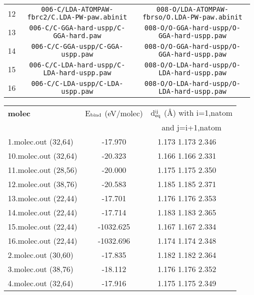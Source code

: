 \documentclass[onecolumn]{revtex4}
\begin{document}
\begin{center}
\begin{tabular}{lcc}
12 & \verb?006-C/LDA-ATOMPAW-fbrc2/C.LDA-PW-paw.abinit? & \verb?008-O/LDA-ATOMPAW-fbrso/O.LDA-PW-paw.abinit? \\
13 & \verb?006-C/C-GGA-hard-uspp/C-GGA-hard.paw? & \verb?008-O/O-GGA-hard-uspp/O-GGA-hard-uspp.paw? \\
14 & \verb?006-C/C-GGA-uspp/C-GGA-uspp.paw? & \verb?008-O/O-GGA-hard-uspp/O-GGA-hard-uspp.paw? \\
15 & \verb?006-C/C-LDA-hard-uspp/C-LDA-hard-uspp.paw? & \verb?008-O/O-LDA-hard-uspp/O-LDA-hard-uspp.paw? \\
16 & \verb?006-C/C-LDA-uspp/C-LDA-uspp.paw? & \verb?008-O/O-LDA-hard-uspp/O-LDA-hard-uspp.paw? \\
\hline
\end{tabular}
\end{center}
\begin{center}
\begin{tabular}{lccccc}
\hline
\hline
\bf{molec}&\multicolumn{2}{c}{E$_{\rm bind}$ (eV/molec)}&\multicolumn{3}{c}{d$_{\rm eq}^{\rm ij}$ (\AA) with i=1,natom} \\
&\multicolumn{2}{c}{}&\multicolumn{3}{c}{and j=i+1,natom} \\
\hline
1.molec.out (32,64)&\multicolumn{2}{c}{-17.970}&\multicolumn{2}{c}{1.173 1.173 2.346 } \\ 
10.molec.out (32,64)&\multicolumn{2}{c}{-20.323}&\multicolumn{2}{c}{1.166 1.166 2.331 } \\ 
11.molec.out (28,56)&\multicolumn{2}{c}{-20.000}&\multicolumn{2}{c}{1.175 1.175 2.350 } \\ 
12.molec.out (38,76)&\multicolumn{2}{c}{-20.583}&\multicolumn{2}{c}{1.185 1.185 2.371 } \\ 
13.molec.out (22,44)&\multicolumn{2}{c}{-17.701}&\multicolumn{2}{c}{1.176 1.176 2.353 } \\ 
14.molec.out (22,44)&\multicolumn{2}{c}{-17.714}&\multicolumn{2}{c}{1.183 1.183 2.365 } \\ 
15.molec.out (22,44)&\multicolumn{2}{c}{-1032.625}&\multicolumn{2}{c}{1.167 1.167 2.334 } \\ 
16.molec.out (22,44)&\multicolumn{2}{c}{-1032.696}&\multicolumn{2}{c}{1.174 1.174 2.348 } \\ 
2.molec.out (30,60)&\multicolumn{2}{c}{-17.835}&\multicolumn{2}{c}{1.182 1.182 2.364 } \\ 
3.molec.out (38,76)&\multicolumn{2}{c}{-18.112}&\multicolumn{2}{c}{1.176 1.176 2.352 } \\ 
4.molec.out (32,64)&\multicolumn{2}{c}{-17.916}&\multicolumn{2}{c}{1.175 1.175 2.349 } \\ 

\end{tabular}
\end{center}
\end{document}
